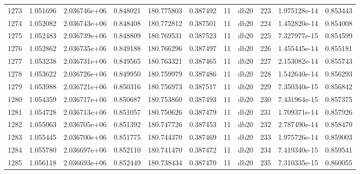 \begin{tabular}{lrrrrrrlrrr}
1273 &    1.051696 &        2.036746e+06 &  0.848021 &              180.775803 &    0.387492 &      11 &         db20 &    223 &   1.975128e-14 &      0.853443 \\
1274 &    1.052082 &        2.036743e+06 &  0.848408 &              180.772812 &    0.387501 &      11 &         db20 &    224 &   1.452820e-14 &      0.854008 \\
1275 &    1.052483 &        2.036739e+06 &  0.848809 &              180.769531 &    0.387523 &      11 &         db20 &    225 &   7.327977e-15 &      0.854599 \\
1276 &    1.052862 &        2.036735e+06 &  0.849188 &              180.766296 &    0.387497 &      11 &         db20 &    226 &   1.455445e-14 &      0.855181 \\
1277 &    1.053238 &        2.036731e+06 &  0.849565 &              180.763321 &    0.387465 &      11 &         db20 &    227 &   2.153082e-14 &      0.855743 \\
1278 &    1.053622 &        2.036726e+06 &  0.849950 &              180.759979 &    0.387486 &      11 &         db20 &    228 &   1.542640e-14 &      0.856293 \\
1279 &    1.053988 &        2.036721e+06 &  0.850316 &              180.756973 &    0.387517 &      11 &         db20 &    229 &   7.350340e-15 &      0.856842 \\
1280 &    1.054359 &        2.036717e+06 &  0.850687 &              180.753860 &    0.387493 &      11 &         db20 &    230 &   7.431964e-15 &      0.857375 \\
1281 &    1.054728 &        2.036713e+06 &  0.851057 &              180.750626 &    0.387479 &      11 &         db20 &    231 &   1.709371e-14 &      0.857926 \\
1282 &    1.055063 &        2.036705e+06 &  0.851392 &              180.747726 &    0.387453 &      11 &         db20 &    232 &   2.787490e-14 &      0.858470 \\
1283 &    1.055445 &        2.036700e+06 &  0.851775 &              180.744370 &    0.387469 &      11 &         db20 &    233 &   1.975726e-14 &      0.859003 \\
1284 &    1.055780 &        2.036697e+06 &  0.852110 &              180.741470 &    0.387472 &      11 &         db20 &    234 &   7.419340e-15 &      0.859541 \\
1285 &    1.056118 &        2.036693e+06 &  0.852449 &              180.738434 &    0.387470 &      11 &         db20 &    235 &   7.310335e-15 &      0.860055 \\

\end{tabular}
